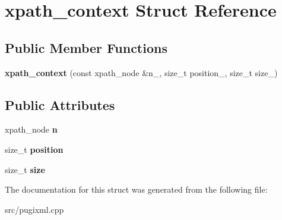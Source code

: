 \hypertarget{structxpath__context}{}\section{xpath\+\_\+context Struct Reference}
\label{structxpath__context}
\subsection*{Public Member Functions}
\begin{DoxyCompactItemize}
\item 
\mbox{\label{structxpath__context_ab5d7a8d5a14ef695b93e15cfb0e20386}} 
{\bfseries xpath\+\_\+context} (const xpath\+\_\+node \&n\+\_\+, size\+\_\+t position\+\_\+, size\+\_\+t size\+\_\+)
\end{DoxyCompactItemize}
\subsection*{Public Attributes}
\begin{DoxyCompactItemize}
\item 
\mbox{\label{structxpath__context_ace8fbb8121820bc5054605c166101273}} 
xpath\+\_\+node {\bfseries n}
\item 
\mbox{\label{structxpath__context_add1fc9bd16b21d3a8d7a4bd63c60af07}} 
size\+\_\+t {\bfseries position}
\item 
\mbox{\label{structxpath__context_a976ffb0eff84a7779c97e589c1785d1c}} 
size\+\_\+t {\bfseries size}
\end{DoxyCompactItemize}


The documentation for this struct was generated from the following file\+:\begin{DoxyCompactItemize}
\item 
src/pugixml.\+cpp\end{DoxyCompactItemize}
